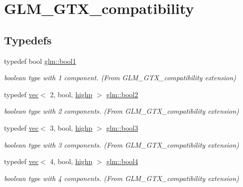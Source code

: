 \hypertarget{group__gtx__compatibility}{}\section{G\+L\+M\+\_\+\+G\+T\+X\+\_\+compatibility}
\label{group__gtx__compatibility}
\subsection*{Typedefs}
\begin{DoxyCompactItemize}
\item 
typedef bool \hyperlink{group__gtx__compatibility_gab65f19f5170f95a2f06d6aa6482c9405}{glm\+::bool1}
\begin{DoxyCompactList}\small\item\em boolean type with 1 component. (From G\+L\+M\+\_\+\+G\+T\+X\+\_\+compatibility extension) \end{DoxyCompactList}\item 
typedef \hyperlink{structglm_1_1vec}{vec}$<$ 2, bool, \hyperlink{namespaceglm_a36ed105b07c7746804d7fdc7cc90ff25ac6f7eab42eacbb10d59a58e95e362074}{highp} $>$ \hyperlink{group__gtx__compatibility_ga19e8114c90e2c81cfa87db72f4020b52}{glm\+::bool2}
\begin{DoxyCompactList}\small\item\em boolean type with 2 components. (From G\+L\+M\+\_\+\+G\+T\+X\+\_\+compatibility extension) \end{DoxyCompactList}\item 
typedef \hyperlink{structglm_1_1vec}{vec}$<$ 3, bool, \hyperlink{namespaceglm_a36ed105b07c7746804d7fdc7cc90ff25ac6f7eab42eacbb10d59a58e95e362074}{highp} $>$ \hyperlink{group__gtx__compatibility_ga9d9411e411bc3bcb7ec64593f5e0908f}{glm\+::bool3}
\begin{DoxyCompactList}\small\item\em boolean type with 3 components. (From G\+L\+M\+\_\+\+G\+T\+X\+\_\+compatibility extension) \end{DoxyCompactList}\item 
typedef \hyperlink{structglm_1_1vec}{vec}$<$ 4, bool, \hyperlink{namespaceglm_a36ed105b07c7746804d7fdc7cc90ff25ac6f7eab42eacbb10d59a58e95e362074}{highp} $>$ \hyperlink{group__gtx__compatibility_ga16892e963e3aa2aa6c826a508d2df3ce}{glm\+::bool4}
\begin{DoxyCompactList}\small\item\em boolean type with 4 components. (From G\+L\+M\+\_\+\+G\+T\+X\+\_\+compatibility extension) \end{DoxyCompactList}\item 

\end{DoxyCompactItemize}
